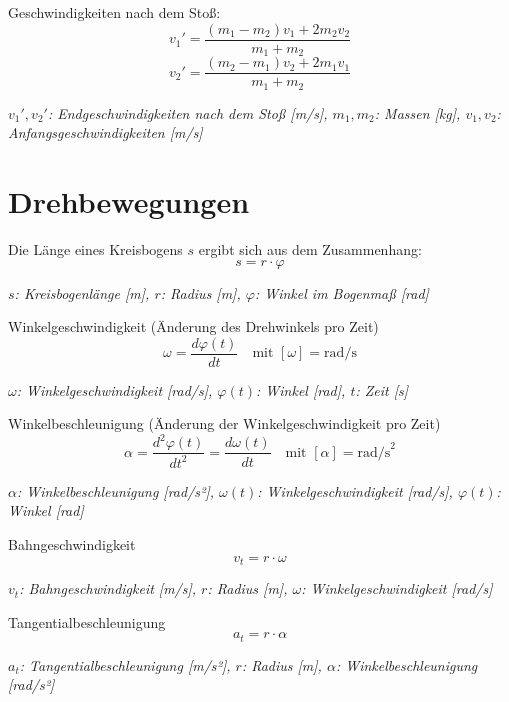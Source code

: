 \documentclass[a5paper,10pt]{article}
\newenvironment{displayformula}
{
	\begin{framed}
		\color{formulaColor}
	}
	{\end{framed}}
\newcommand{\formulalegend}[1]{%
	\par\vspace{0.5ex}%
	{{\color{legendColor}\RaggedRight\small\textit{#1}}}%
	\par\vspace{1.5ex}%
}
\begin{document}
\begin{displayformula}
	Geschwindigkeiten nach dem Stoß:
	\[
	v_1' = \frac{(m_1 - m_2) v_1 + 2 m_2 v_2}{m_1 + m_2}
	\]
	\[
	v_2' = \frac{(m_2 - m_1) v_2 + 2 m_1 v_1}{m_1 + m_2}
	\]
\end{displayformula}
\formulalegend{
	\( v_1', v_2' \): Endgeschwindigkeiten nach dem Stoß [m/s], \( m_1, m_2 \): Massen [kg], \( v_1, v_2 \): Anfangsgeschwindigkeiten [m/s]
}
\newpage
\section{Drehbewegungen}

\begin{displayformula}
	Die Länge eines Kreisbogens \( s \) ergibt sich aus dem Zusammenhang:
	\[
	s = r \cdot \varphi 
	\]
\end{displayformula}
\formulalegend{
	\( s \): Kreisbogenlänge [m], \( r \): Radius [m], \( \varphi \): Winkel im Bogenmaß [rad]
}

\begin{displayformula}
	Winkelgeschwindigkeit (Änderung des Drehwinkels pro Zeit)
	\[
	\omega = \frac{d\varphi(t)}{dt} \quad \text{mit } [\omega] = \text{rad/s}
	\]
\end{displayformula}
\formulalegend{
	\( \omega \): Winkelgeschwindigkeit [rad/s], \( \varphi(t) \): Winkel [rad], \( t \): Zeit [s]
}

\begin{displayformula}
	Winkelbeschleunigung (Änderung der Winkelgeschwindigkeit pro Zeit)
	\[
	\alpha = \frac{d^2 \varphi(t)}{dt^2} = \frac{d\omega(t)}{dt} \quad \text{mit } [\alpha] = \text{rad/s}^2
	\]
\end{displayformula}
\formulalegend{
	\( \alpha \): Winkelbeschleunigung [rad/s²], \( \omega(t) \): Winkelgeschwindigkeit [rad/s], \( \varphi(t) \): Winkel [rad]
}

\begin{displayformula}
	Bahngeschwindigkeit
	\[
	v_t = r \cdot \omega
	\]
\end{displayformula}
\formulalegend{
	\( v_t \): Bahngeschwindigkeit [m/s], \( r \): Radius [m], \( \omega \): Winkelgeschwindigkeit [rad/s]
}

\begin{displayformula}
	Tangentialbeschleunigung
	\[
	a_t = r \cdot \alpha
	\]
\end{displayformula}
\formulalegend{
	\( a_t \): Tangentialbeschleunigung [m/s²], \( r \): Radius [m], \( \alpha \): Winkelbeschleunigung [rad/s²]
}
\end{document}
